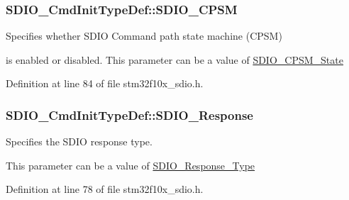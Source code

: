 \hypertarget{struct_s_d_i_o___cmd_init_type_def_ab0e869ae285cc132478dd743c28cd8e2}{
\subsubsection[{S\-D\-I\-O\-\_\-\-C\-P\-S\-M}]{ S\-D\-I\-O\-\_\-\-Cmd\-Init\-Type\-Def\-::\-S\-D\-I\-O\-\_\-\-C\-P\-S\-M}}\label{struct_s_d_i_o___cmd_init_type_def_ab0e869ae285cc132478dd743c28cd8e2}
\begin{DoxyVerb}      Specifies whether SDIO Command path state machine (CPSM)
\end{DoxyVerb}
 is enabled or disabled. This parameter can be a value of \hyperlink{group___s_d_i_o___c_p_s_m___state}{S\-D\-I\-O\-\_\-\-C\-P\-S\-M\-\_\-\-State} 

Definition at line 84 of file stm32f10x\-\_\-sdio.\-h.

\hypertarget{struct_s_d_i_o___cmd_init_type_def_aecb203e21321126d5f05c34787cacfd2}{
\subsubsection[{S\-D\-I\-O\-\_\-\-Response}]{ S\-D\-I\-O\-\_\-\-Cmd\-Init\-Type\-Def\-::\-S\-D\-I\-O\-\_\-\-Response}}\label{struct_s_d_i_o___cmd_init_type_def_aecb203e21321126d5f05c34787cacfd2}
\begin{DoxyVerb}  Specifies the SDIO response type.
\end{DoxyVerb}
 This parameter can be a value of \hyperlink{group___s_d_i_o___response___type}{S\-D\-I\-O\-\_\-\-Response\-\_\-\-Type} 

Definition at line 78 of file stm32f10x\-\_\-sdio.\-h.

